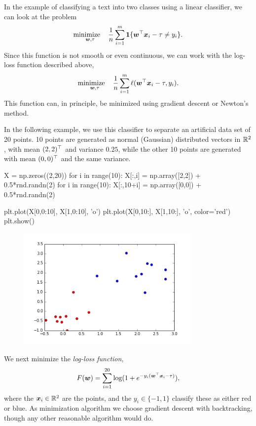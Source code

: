 \begin{example}
In the example of classifying a text into two classes using a linear classifier, we can look at the problem
\begin{equation*}
 \mathop{\text{minimize}\quad}_{\bm{w}, \tau} \frac{1}{n}\sum_{i=1}^m \mathbf{1}\{\bm{w}^{\top}\bm{x}_i-\tau \neq y_i\}.
\end{equation*}
Since this function is not smooth or even continuous, we can work with the log-loss function described above,
\begin{equation*}
\mathop{\text{minimize}\quad}_{\bm{w}, \tau} \frac{1}{n} \sum_{i=1}^m \ell(\bm{w}^{\top}\bm{x}_i-\tau, y_i).
\end{equation*}
This function can, in principle, be minimized using gradient descent or Newton's method. 

In the following example, we use this classifier to separate an artificial data set of 20 points. 10 points are generated as normal (Gaussian) distributed vectors in $\mathbb{R}^2$, with mean $(2,2)^{\top}$ and variance $0.25$, while the other 10 points are generated with mean $(0,0)^{\top}$ and the same variance.

\begin{ipythonnb}
X = np.zeros((2,20))
for i in range(10):
    X[:,i] = np.array([2,2]) + 0.5*rnd.randn(2)
for i in range(10):
    X[:,10+i] = np.array([0,0]) + 0.5*rnd.randn(2)
    
plt.plot(X[0,0:10], X[1,0:10], 'o')
plt.plot(X[0,10:], X[1,10:], 'o', color='red')
plt.show()
\end{ipythonnb}

\begin{figure}[h!]
\centering
\includegraphics[width=0.8\textwidth]{images/pointcloud.png}
\end{figure}

We next minimize the {\em log-loss function},
\begin{equation*}
  F(\bm{w}) = \sum_{i=1}^{20} \log(1+e^{-y_i (\bm{w}^{\top}\bm{x}_i-\tau)}),
\end{equation*}
where the $\bm{x}_i\in \mathbb{R}^2$ are the points, and the $y_i\in \{-1,1\}$ classify these as either red or blue. As minimization algorithm we choose gradient descent with backtracking, though any other reasonable algorithm would do.


\end{example}
